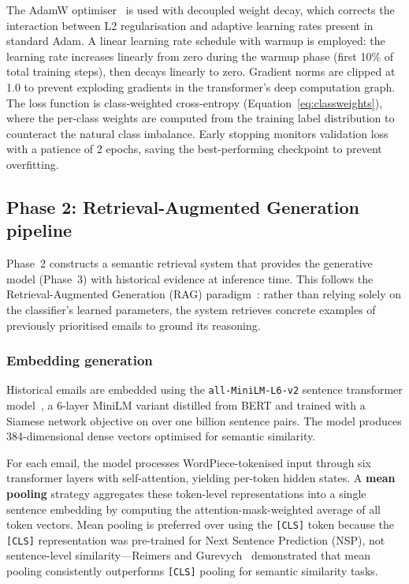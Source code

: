 \documentclass[3p,times,procedia]{elsarticle}
\begin{document}
The AdamW optimiser~\cite{loshchilov2019} is used with decoupled weight decay, which corrects the interaction between L2 regularisation and adaptive learning rates present in standard Adam. A linear learning rate schedule with warmup is employed: the learning rate increases linearly from zero during the warmup phase (first 10\% of total training steps), then decays linearly to zero. Gradient norms are clipped at 1.0 to prevent exploding gradients in the transformer's deep computation graph. The loss function is class-weighted cross-entropy (Equation~\ref{eq:classweights}), where the per-class weights are computed from the training label distribution to counteract the natural class imbalance. Early stopping monitors validation loss with a patience of 2 epochs, saving the best-performing checkpoint to prevent overfitting.

\subsection{Phase 2: Retrieval-Augmented Generation pipeline}
\label{sec:phase2}

Phase~2 constructs a semantic retrieval system that provides the generative model (Phase~3) with historical evidence at inference time. This follows the Retrieval-Augmented Generation (RAG) paradigm~\cite{lewis2020}: rather than relying solely on the classifier's learned parameters, the system retrieves concrete examples of previously prioritised emails to ground its reasoning.

\subsubsection{Embedding generation}

Historical emails are embedded using the \texttt{all-MiniLM-L6-v2} sentence transformer model~\cite{reimers2019}, a 6-layer MiniLM variant distilled from BERT and trained with a Siamese network objective on over one billion sentence pairs. The model produces 384-dimensional dense vectors optimised for semantic similarity.

For each email, the model processes WordPiece-tokenised input through six transformer layers with self-attention, yielding per-token hidden states. A \textbf{mean pooling} strategy aggregates these token-level representations into a single sentence embedding by computing the attention-mask-weighted average of all token vectors. Mean pooling is preferred over using the \texttt{[CLS]} token because the \texttt{[CLS]} representation was pre-trained for Next Sentence Prediction (NSP), not sentence-level similarity---Reimers and Gurevych~\cite{reimers2019} demonstrated that mean pooling consistently outperforms \texttt{[CLS]} pooling for semantic similarity tasks.
\end{document}
